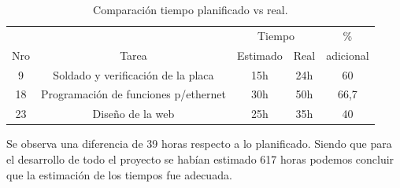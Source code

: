 \begin{table}[hp]
  \begin{tabular}{|c|c|c|c|c|}
    \hline
       &       & \multicolumn{2}{c|}{ Tiempo} & \%  \\ \cline{3-4}
    Nro& Tarea &       Estimado &  Real       & adicional \\
    \hline
    9 & Soldado y verificación de la placa & 15h & 24h & 60 \\
    18 & Programación de funciones p/ethernet & 30h & 50h & 66,7 \\
    23 & Diseño de la web & 25h & 35h & 40 \\
    \hline \hline
  \end{tabular}
  \caption{Comparación tiempo planificado vs real.}
  \label{tab:update_task}
\end{table}

Se observa una diferencia de 39 horas respecto a lo planificado. Siendo que para el desarrollo de todo el proyecto se habían estimado 617 horas podemos concluir que la estimación de los tiempos fue adecuada. 


